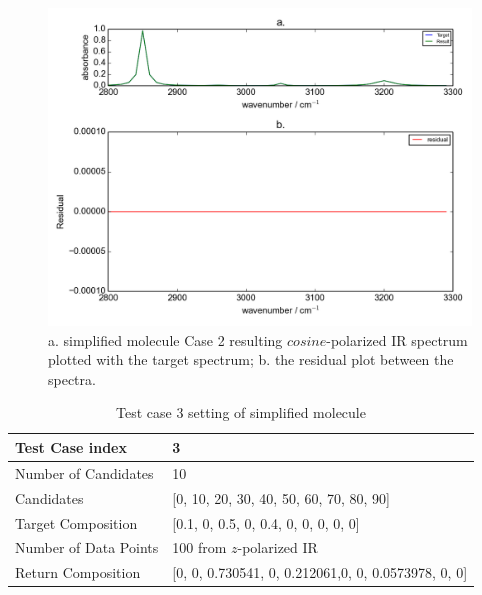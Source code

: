 \begin{figure}[!ht] 
\includegraphics[scale=0.7]{Figures/toy_model_result_plotting_ir_cos_4candi_1.png}
\caption{a. simplified molecule Case 2 resulting $cosine$-polarized IR spectrum plotted with the target spectrum; b. the residual plot between the spectra.}
\label{fig:3.2}
\end{figure}

\begin{table} 
\begin{tabular}{| l | p{7cm} | }
\hline
Test Case index & 3  \\
\hline
Number of Candidates & 10   \\
\hline
Candidates & [0, 10, 20, 30, 40, 50, 60, 70, 80, 90]  \\
\hline
Target Composition & [0.1, 0, 0.5, 0, 0.4, 0, 0, 0, 0, 0] \\
\hline
Number of Data Points & 100 from $z$-polarized IR \\
\hline
Return Composition & [0, 0, 0.730541, 0, 0.212061,0, 0, 0.0573978, 0, 0] \\
\hline
\end{tabular}
\caption{Test case 3 setting of simplified molecule}
\label{tab:3.2}
\end{table}	

